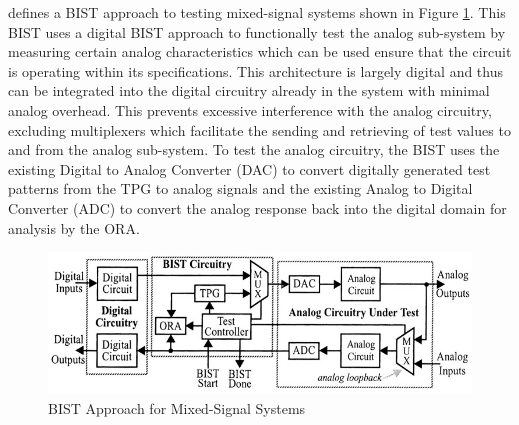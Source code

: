 \documentclass[12pt]{report}
\begin{document}
\cite{stroud} defines a BIST approach to testing mixed-signal systems shown in Figure \ref{fig:mixedbist1}.  This BIST uses a digital BIST approach to functionally test the analog sub-system by measuring certain analog characteristics which can be used ensure that the circuit is operating within its specifications.  This architecture is largely digital and thus can be integrated into the digital circuitry already in the system with minimal analog overhead.  This prevents excessive interference with the analog circuitry, excluding multiplexers which facilitate the sending and retrieving of test values to and from the analog sub-system\cite{stroud}.  To test the analog circuitry, the BIST uses the existing Digital to Analog Converter (DAC) to convert digitally generated test patterns from the TPG to analog signals and the existing Analog to Digital Converter (ADC) to convert the analog response back into the digital domain for analysis by the ORA\cite{stroud}.
\begin{figure}
	\begin{center}
		\includegraphics[scale=1]{images/mixed-bist-architecture}
	\end{center}
	\caption{BIST Approach for Mixed-Signal Systems\cite{stroud}}
	\label{fig:mixedbist1}
\end{figure}
\end{document}
